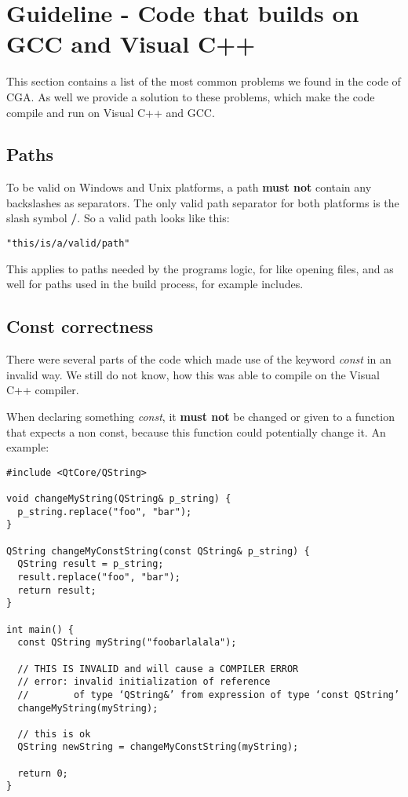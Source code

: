 \section{Guideline - Code that builds on GCC and Visual C++} This section contains a list of the most common problems we found in the code of CGA. As well we provide a solution to these problems, which make the code compile and run on Visual C++ and GCC.

\subsection{Paths} To be valid on Windows and Unix platforms, a path \textbf{must not} contain any backslashes as separators. The only valid path separator for both platforms is the slash symbol \textbf{/}. So a valid path looks like this: 
\begin{verbatim}
"this/is/a/valid/path" 
\end{verbatim}
This applies to paths needed by the programs logic, for like opening files, and as well for paths used in the build process, for example includes.

\subsection{Const correctness} There were several parts of the code which made use of the keyword \emph{const} in an invalid way. We still do not know, how this was able to compile on the Visual C++ compiler. 

When declaring something \emph{const}, it \textbf{must not} be changed or given to a function that expects a non const, because this function could potentially change it. An example:
\begin{verbatim}
#include <QtCore/QString>

void changeMyString(QString& p_string) {
  p_string.replace("foo", "bar");
}

QString changeMyConstString(const QString& p_string) {
  QString result = p_string;
  result.replace("foo", "bar");
  return result;
}

int main() {
  const QString myString("foobarlalala");

  // THIS IS INVALID and will cause a COMPILER ERROR
  // error: invalid initialization of reference 
  //        of type ‘QString&’ from expression of type ‘const QString’
  changeMyString(myString);

  // this is ok
  QString newString = changeMyConstString(myString);

  return 0;
}
\end{verbatim}

